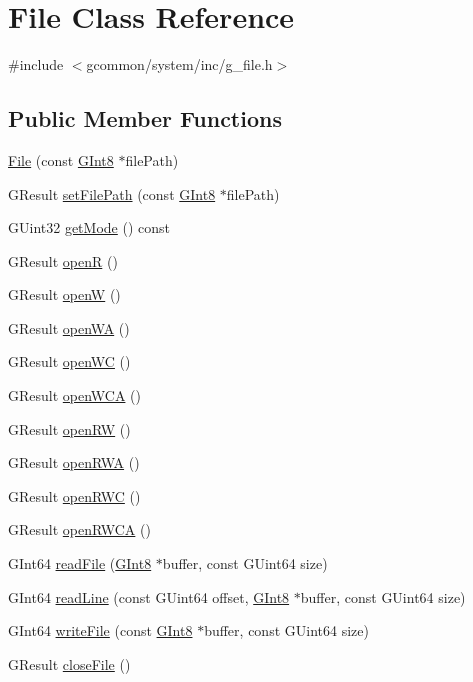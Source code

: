 \hypertarget{class_file}{\section{File Class Reference}
\label{class_file}
}


{\ttfamily \#include $<$gcommon/system/inc/g\-\_\-file.\-h$>$}

\subsection*{Public Member Functions}
\begin{DoxyCompactItemize}
\item 
\hyperlink{class_file_ab825d28f207991d4d091998f6d0105f6}{File} (const \hyperlink{g__type_8h_ad1732c0e4cf5d108f232e44a1179e8b0}{G\-Int8} $\ast$file\-Path)
\item 
G\-Result \hyperlink{class_file_ac0582691c9aa54761291dbb88f86ddfc}{set\-File\-Path} (const \hyperlink{g__type_8h_ad1732c0e4cf5d108f232e44a1179e8b0}{G\-Int8} $\ast$file\-Path)
\item 
G\-Uint32 \hyperlink{class_file_aabc7d55e3140f0e4897750e9d85e14c3}{get\-Mode} () const 
\item 
G\-Result \hyperlink{class_file_a128e8b16a7cac924af38293b1a087e90}{open\-R} ()
\item 
G\-Result \hyperlink{class_file_ac74b734532d0a2bfa8602f3a45266279}{open\-W} ()
\item 
G\-Result \hyperlink{class_file_aa89dd76d8c9368da98604b80eeae8bc4}{open\-W\-A} ()
\item 
G\-Result \hyperlink{class_file_a0380f40732ffe816f0501c793adbd80c}{open\-W\-C} ()
\item 
G\-Result \hyperlink{class_file_a80184e37768cd4d2c50ab87755e18018}{open\-W\-C\-A} ()
\item 
G\-Result \hyperlink{class_file_a87db685266f7e2b63518a974302997ac}{open\-R\-W} ()
\item 
G\-Result \hyperlink{class_file_a8da03f40f718e43fcb0c7c6ca14562d3}{open\-R\-W\-A} ()
\item 
G\-Result \hyperlink{class_file_a3319dacbf13d0e08000d799294c9d957}{open\-R\-W\-C} ()
\item 
G\-Result \hyperlink{class_file_aec3447af5bea1235b09e96701171e0e2}{open\-R\-W\-C\-A} ()
\item 
G\-Int64 \hyperlink{class_file_a0cbdaacc6b7edbe8f9b190c0b9ce55c2}{read\-File} (\hyperlink{g__type_8h_ad1732c0e4cf5d108f232e44a1179e8b0}{G\-Int8} $\ast$buffer, const G\-Uint64 size)
\item 
G\-Int64 \hyperlink{class_file_aa40eaafd8303f9191510850d6962767a}{read\-Line} (const G\-Uint64 offset, \hyperlink{g__type_8h_ad1732c0e4cf5d108f232e44a1179e8b0}{G\-Int8} $\ast$buffer, const G\-Uint64 size)
\item 
G\-Int64 \hyperlink{class_file_a7f0dadd31399af5542742ef9cba228e2}{write\-File} (const \hyperlink{g__type_8h_ad1732c0e4cf5d108f232e44a1179e8b0}{G\-Int8} $\ast$buffer, const G\-Uint64 size)
\item 
G\-Result \hyperlink{class_file_a3e4be7d0232f3b8ba611360a0e1de626}{close\-File} ()
\end{DoxyCompactItemize}


